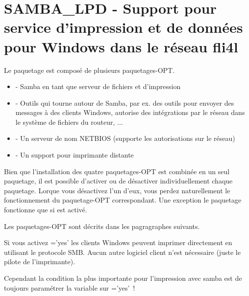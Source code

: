 
\section{SAMBA\_LPD - Support pour service d'impression et de données pour Windows dans le réseau fli4l}

Le paquetage  est composé de plusieurs paquetages-OPT.

\begin{itemize}
\item {} - Samba en tant que serveur de fichiers et d'impression
\item {} - Outils qui tourne autour de Samba, par ex.
  des outils pour envoyer des messages à des clients Windows, autorise des
  intégrations par le réseau dans le système de fichiers du routeur, ...
\item {} - Un serveur de nom NETBIOS (supporte les autorisations sur le réseau)
\item {} - Un support pour imprimante distante
\end{itemize}

Bien que l'installation des quatre paquetages-OPT est combinée en un seul
paquetage, il est possible d'activer ou de désactiver individuellement chaque
paquetage. Lorque vous désactivez l'un d'eux, vous perdez naturellement le
fonctionnement du paquetage-OPT correspondant. Une exception le paquetage
 fonctionne que si  est activé.


Les paquetages-OPT sont décrits dans les pagragraphes suivants.



    Si vous activez ='yes' les clients Windows peuvent imprimer
    directement en utilisant le protocole SMB. Aucun autre logiciel client n'est
    nécessaire (juste le pilote de l'imprimante).

   Cependant la condition la plus importante pour l'impression avec samba est
   de toujours paramétrer la variable sur ='yes'~!

